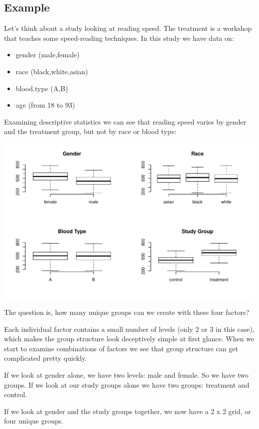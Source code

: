 \documentclass[]{book}
\providecommand{\tightlist}{%
  \setlength{\itemsep}{0pt}\setlength{\parskip}{0pt}}
\theoremstyle{definition}
\theoremstyle{definition}
\theoremstyle{definition}
\theoremstyle{remark}
\begin{document}
\hypertarget{example}{%
\subsection{Example}\label{example}}

Let's think about a study looking at reading speed. The treatment is a
workshop that teaches some speed-reading techniques. In this study we
have data on:

\begin{itemize}
\tightlist
\item
  gender (male,female)
\item
  race (black,white,asian)
\item
  blood.type (A,B)
\item
  age (from 18 to 93)
\end{itemize}

Examining descriptive statistics we can see that reading speed varies by
gender and the treatment group, but not by race or blood type:

\begin{center}\includegraphics[width=0.7\linewidth]{DS4PS-I_files/figure-latex/unnamed-chunk-112-1} \end{center}

The question is, how many unique groups can we create with these four
factors?

Each individual factor contains a small number of levels (only 2 or 3 in
this case), which makes the group structure look deceptively simple at
first glance. When we start to examine combinations of factors we see
that group structure can get complicated pretty quickly.

If we look at gender alone, we have two levels: male and female. So we
have two groups. If we look at our study groups alone we have two
groups: treatment and control.

If we look at gender and the study groups together, we now have a 2 x 2
grid, or four unique groups.
\end{document}
